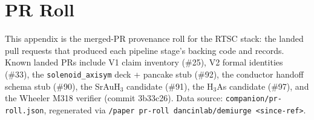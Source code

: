 \section{PR Roll}
\label{app:prroll}

This appendix is the merged-PR provenance roll for the RTSC stack: the
landed pull requests that produced each pipeline stage's backing code
and records. Known landed PRs include V1 claim inventory (\#25), V2
formal identities (\#33), the \texttt{solenoid\_axisym} deck +
pancake stub (\#92), the conductor handoff schema stub (\#90), the
SrAuH$_3$ candidate (\#91), the H$_3$As candidate (\#97), and the
Wheeler M318 verifier (commit 3b33c26). Data source:
\texttt{companion/pr-roll.json}, regenerated via
\texttt{/paper pr-roll dancinlab/demiurge <since-ref>}.

